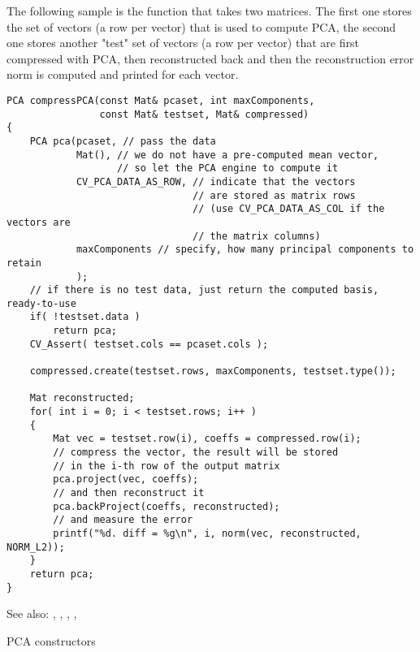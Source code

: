 The following sample is the function that takes two matrices. The first one stores the set of vectors (a row per vector) that is used to compute PCA, the second one stores another "test" set of vectors (a row per vector) that are first compressed with PCA, then reconstructed back and then the reconstruction error norm is computed and printed for each vector.
\begin{lstlisting}
PCA compressPCA(const Mat& pcaset, int maxComponents,
                const Mat& testset, Mat& compressed)
{
    PCA pca(pcaset, // pass the data
            Mat(), // we do not have a pre-computed mean vector,
                   // so let the PCA engine to compute it
            CV_PCA_DATA_AS_ROW, // indicate that the vectors
                                // are stored as matrix rows
                                // (use CV_PCA_DATA_AS_COL if the vectors are
                                // the matrix columns)
            maxComponents // specify, how many principal components to retain
            );
    // if there is no test data, just return the computed basis, ready-to-use
    if( !testset.data )
        return pca;
    CV_Assert( testset.cols == pcaset.cols );

    compressed.create(testset.rows, maxComponents, testset.type());

    Mat reconstructed;
    for( int i = 0; i < testset.rows; i++ )
    {
        Mat vec = testset.row(i), coeffs = compressed.row(i);
        // compress the vector, the result will be stored
        // in the i-th row of the output matrix
        pca.project(vec, coeffs);
        // and then reconstruct it
        pca.backProject(coeffs, reconstructed);
        // and measure the error
        printf("%d. diff = %g\n", i, norm(vec, reconstructed, NORM_L2));
    }
    return pca;
}
\end{lstlisting}

See also: , , , , 

PCA constructors

\begin{description}
\begin{description}
\end{description}
\end{description}

